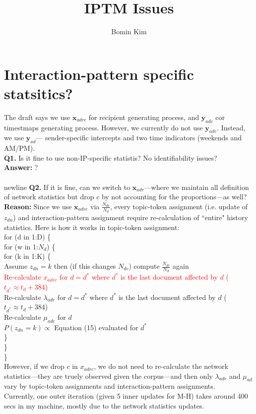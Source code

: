 \documentclass[12pt,a4paper]{article}
\title{IPTM Issues}
\author{Bomin Kim}
\begin{document}
\maketitle
\section{Interaction-pattern specific statsitics?}
The draft says we use $\boldsymbol{x}_{adrc}$ for recipient generating process, and $\boldsymbol{y}_{adc}$ cor timestmaps generating process. However, we currently do not use $\boldsymbol{y}_{adc}$. Instead, we use $\boldsymbol{y}_{ad}$--- sender-specific intercepts and two time indicators (weekends and AM/PM).\\ \newline
\textbf{Q1.} Is it fine to use non-IP-specific statistis? No identifiability issues?\\\newline
\textbf{Answer:} ?\\\\newline 
\textbf{Q2.} If it is fine, can we switch to $\boldsymbol{x}_{adr}$---where we maintain all definition of network statistics but drop $c$ by not accounting for the proportions---as well?\\\newline
\textbf{Reason:} Since we use $\boldsymbol{x}_{adrc}$ via $\frac{N_{dc}}{N_d}$, every topic-token assignment (i.e. update of $z_{dn}$) and interaction-pattern assignment require re-calculation of ``entire" history statistics. Here is how it works in topic-token assignment:\\ \newline
for (d in 1:D) \{\\
for (w in 1:$N_d$) \{\\
for (k in 1:K) \{\\
	Assume $z_{dn}=k$ then (if this changes $N_{dc}$) compute $\frac{N_{dc}}{N_d}$ again\\
	\textcolor{red}{Re-calculate $x_{adrc}$ for $d=d^*$ where $d^*$ is the last document affected by $d$  ($t_{d^*}\approx t_d+384$)}\\
	Re-calculate $\lambda_{adr}$ for $d=d^*$ where $d^*$ is the last document affected by $d$ ($t_{d^*}\approx t_d+384$)\\
	Re-calculate $\mu_{adc}$ for $d$ \\		
	$P(z_{dn}=k) \propto $ Equation (15) evaluated for $d^*$\\
		\}\\
	\}\\
\}\\ \newline
However, if we drop $c$ in $x_{adrc}$, we do not need to re-calculate the network statistics---they are truely observed given the corpus---and then only $\lambda_{adr}$ and $\mu_{ad}$ vary by topic-token assignments and interaction-pattern assignments.\\\newline
Currently, one outer iteration (given 5 inner updates for M-H) takes around 400 secs in my machine, mostly due to the network statistics updates.
\end{document}
